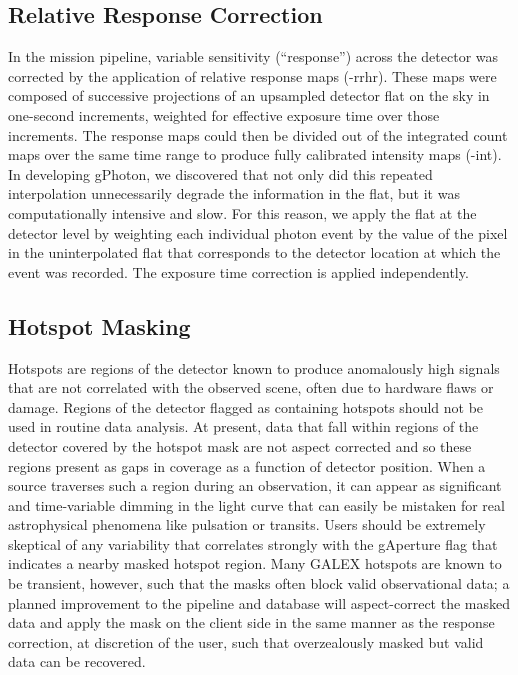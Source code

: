\documentclass[trackchanges,preprint2]{aastex}
\begin{document}
\subsection{Relative Response Correction}
\label{relresponsecorr}
In the mission pipeline, variable sensitivity (``response'') across the detector was corrected by the application of relative response maps (-rrhr). These maps were composed of successive projections of an upsampled detector flat on the sky in one-second increments, weighted for effective exposure time over those increments. The response maps could then be divided out of the integrated count maps over the same time range to produce fully calibrated intensity maps (-int). In developing gPhoton, we discovered that not only did this repeated interpolation unnecessarily degrade the information in the flat, but it was computationally intensive and slow. For this reason, we apply the flat at the detector level by weighting each individual photon event by the value of the pixel in the uninterpolated flat that corresponds to the detector location at which the event was recorded. The exposure time correction is applied independently.

\subsection{Hotspot Masking}
\label{hotspot}
Hotspots are regions of the detector known to produce anomalously high signals that are not correlated with the observed scene, often due to hardware flaws or damage. Regions of the detector flagged as containing hotspots should not be used in routine data analysis. At present, data that fall within regions of the detector covered by the hotspot mask are not aspect corrected and so these regions present as gaps in coverage as a function of detector position. When a source traverses such a region during an observation, it can appear as significant and time-variable dimming in the light curve that can easily be mistaken for real astrophysical phenomena like pulsation or transits. Users should be extremely skeptical of any variability that correlates strongly with the gAperture flag that indicates a nearby masked hotspot region. Many GALEX hotspots are known to be transient, however, such that the masks often block valid observational data; a planned improvement to the pipeline and database will aspect-correct the masked data and apply the mask on the client side in the same manner as the response correction, at discretion of the user, such that overzealously masked but valid data can be recovered.
\end{document}
